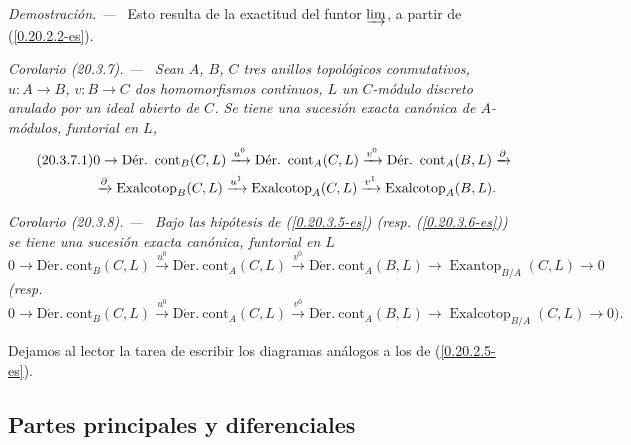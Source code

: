 \documentclass[10pt,oneside]{book}
\makeatletter
\newcommand{\sref}[1]{\textup{(\ref{#1})}}
\newcommand{\setmanualcurrentlabel}[1]{\def\@currentlabel{#1}}
\newenvironment{corollary}[1][]{%
  \setmanualcurrentlabel{#1}\par\medskip\noindent\itshape Corolario (#1). ---\ }{\par}
\newenvironment{proof}{%
  \par\medskip\noindent\textit{Demostración. ---\ }}{\par}
\makeatother
\begin{document}
\begin{proof}
Esto resulta de la exactitud del funtor $\varinjlim$, a partir de
\sref{0.20.2.2-es}.
\end{proof}

\begin{corollary}[20.3.7]
\label{0.20.3.7-es}
Sean $A$, $B$, $C$ tres anillos topológicos conmutativos, $u:A\to B$,
$v:B\to C$ dos homomorfismos continuos, $L$ un $C$-módulo discreto anulado
por un ideal abierto de $C$. Se tiene una sucesión exacta canónica de $A$-módulos,
funtorial en $L$,
\begin{align}
\tag{20.3.7.1}
\label{0.20.3.7.1-es}
  &0\to\operatorname{D\acute{e}r.\ cont}_B(C,L)\xrightarrow{u^0}
  \operatorname{D\acute{e}r.\ cont}_A(C,L)\xrightarrow{v^0}
  \operatorname{D\acute{e}r.\ cont}_A(B,L)\xrightarrow{\partial} \\
  &\xrightarrow{\partial}\operatorname{Exalcotop}_B(C,L)\xrightarrow{u^1}
  \operatorname{Exalcotop}_A(C,L)\xrightarrow{v^1}
  \operatorname{Exalcotop}_A(B,L). \notag
\end{align}
\end{corollary}

\begin{corollary}[20.3.8]
\label{0.20.3.8-es}
Bajo las hipótesis de \sref{0.20.3.5-es} \textup{(resp.}
\sref{0.20.3.6-es}) se tiene una sucesión exacta canónica, funtorial en $L$
\begin{equation}
\tag{20.3.8.1}
\label{0.20.3.8.1-es}
  0\to\operatorname{D\acute{e}r.\ cont}_B(C,L)\xrightarrow{u^0}
  \operatorname{D\acute{e}r.\ cont}_A(C,L)\xrightarrow{v^0}
  \operatorname{D\acute{e}r.\ cont}_A(B,L)\to
  \operatorname{Exantop}_{B/A}(C,L)\to0
\end{equation}
\textup{(resp.}
\begin{equation}
\tag{20.3.8.2}
\label{0.20.3.8.2-es}
  0\to\operatorname{D\acute{e}r.\ cont}_B(C,L)\xrightarrow{u^0}
  \operatorname{D\acute{e}r.\ cont}_A(C,L)\xrightarrow{v^0}
  \operatorname{D\acute{e}r.\ cont}_A(B,L)\to
  \operatorname{Exalcotop}_{B/A}(C,L)\to0\text{).}
\end{equation}
\end{corollary}

Dejamos al lector la tarea de escribir los diagramas análogos a los de
\sref{0.20.2.5-es}.

\subsection{Partes principales y diferenciales}
\label{subsection:0.20.4-es}
\end{document}
